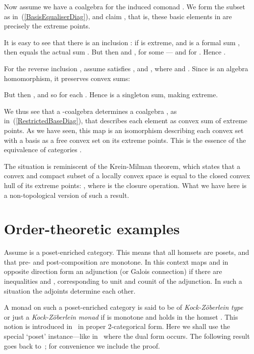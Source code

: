 \documentclass{LMCS}
\begin{document}
Now assume we have a coalgebra  for the induced comonad . We form the subset  as in~(\ref{BasisEqualiserDiag}), and claim
, that is, these basic elements in  are
precisely the extreme points.

It is easy to see that there is an inclusion : if  is extreme, and  is a formal sum
, then  equals the actual sum
. But then  and , for
some  --- and  for . Hence .

For the reverse inclusion , assume  satisfies , and , where  and . Since  is an algebra homomorphism,
it preserves convex sums:


\noindent But then , and so  for each .
Hence  is a singleton sum, making  extreme.

We thus see that a -coalgebra  determines a coalgebra , as in~(\ref{RestrictedBaseDiag}), that describes
each element as convex sum of extreme points. As we have seen, this
map  is an isomorphism  describing each convex set with a basis as a
free convex set on its extreme points. This is the essence of the
equivalence of categories .

The situation is reminiscent of the Krein-Milman theorem, which states
that a convex and compact subset  of a locally convex space is
equal to the closed convex hull of its extreme points: , where  is the closure
operation. What we have here is a non-topological version of such a
result.




\section{Order-theoretic examples}\label{OrderSec}


Assume  is a poset-enriched category. This means that all
homsets  are posets, and that pre- and post-composition
are monotone. In this context maps  and
 in opposite direction form an adjunction
 (or Galois connection) if there are inequalities
 and ,
corresponding to unit and counit of the adjunction. In such a
situation the adjoints  determine each other.

A monad  on such a poset-enriched category
 is said to be of \textit{Kock-Z{\"o}berlein type} or just a
\textit{Kock-Z{\"o}berlein monad} if  is monotone and  holds in the homset . This
notion is introduced in~\cite{Kock95} in proper 2-categorical form.
Here we shall use the special `poset' instance---like
in~\cite{Escardo98} where the dual form occurs. The following result
goes back to~\cite{Kock95}; for convenience we include the proof.
\end{document}
